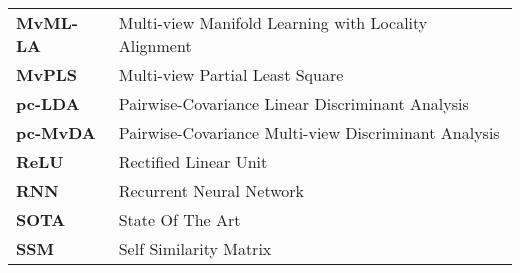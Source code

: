 \begin{longtable}{p{} p{}}
    \textbf{MvML-LA} & Multi-view Manifold Learning with Locality Alignment\\
    \textbf{MvPLS} & Multi-view Partial Least Square\\
    \textbf{pc-LDA} & Pairwise-Covariance Linear Discriminant Analysis\\
    \textbf{pc-MvDA} & Pairwise-Covariance Multi-view Discriminant Analysis\\
    \textbf{ReLU} & Rectified Linear Unit\\
    \textbf{RNN} & Recurrent Neural Network\\
    \textbf{SOTA} & State Of The Art\\
    \textbf{SSM} & Self Similarity Matrix\\
\end{longtable}

\resethead
